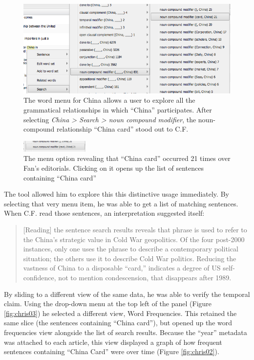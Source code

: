 \documentclass{sig-alternate}
\begin{document}
\begin{figure}[h!]
\includegraphics[width=\textwidth]{fig/chris/01.png}
\caption{The word menu for China allows a user to explore all the grammatical relationships in which ``China'' participates.   After selecting \emph{China > Search > noun compound modifier}, the noun-compound relationship ``China card'' stood out to C.F. \label{fig:chris01}}
\end{figure}

\begin{figure}[h!]
\includegraphics[width=0.3\textwidth]{fig/chris/01b.png}
\caption{ The menu option revealing that ``China card'' occurred 21 times over Fan's editorials. Clicking on it opens up the list of sentences containing ``China card''  \label{fig:chris01b}}
\end{figure}


The tool allowed him to explore this this distinctive usage immediately. By selecting that very menu item, he was able to get a list of matching sentences. When C.F. read those sentences, an interpretation suggested itself:
\begin{quote}[Reading] the sentence search results reveals that phrase is used to refer to the China's strategic value in Cold War geopolitics. Of the four post-2000 instances, only one uses the phrase to describe a contemporary political situation; the others use it to describe Cold War politics. Reducing the vastness of China to a disposable ``card,'' indicates a degree of US self-confidence, not to mention condescension, that disappears after 1989.\end{quote}
By sliding to a different view of the same data, he was able to verify the temporal claim. Using the drop-down menu at the top left of the panel (Figure \ref{fig:chris03}) he selected a different view, Word Frequencies. This retained the same slice (the sentences containing ``China card''), but opened up the word frequencies view alongside the list of search results.  Because the ``year'' metadata was attached to each article, this view displayed a graph of how frequent  sentences containing ``China Card'' were over time (Figure \ref{fig:chris02}). 
\end{document}
